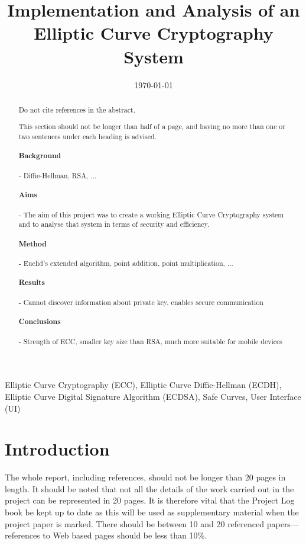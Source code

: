 \documentclass[12pt,a4paper]{article}
\title{Implementation and Analysis of an Elliptic Curve Cryptography System}
\author{} %
\date{\today}
\begin{document}
\maketitle

\begin{abstract}
Do not cite references in the abstract.

This section should not be longer than half of a page, and having no more than one or two sentences under each heading is advised.

\paragraph{Background} -
Diffie-Hellman, RSA, ...

\paragraph{Aims} -
The aim of this project was to create a working Elliptic Curve Cryptography system 
and to analyse that system in terms of security and efficiency. 

\paragraph{Method} -
Euclid's extended algorithm, point addition, point multiplication, ...

\paragraph{Results} -
Cannot discover information about private key, enables secure communication

\paragraph{Conclusions} -
Strength of ECC, smaller key size than RSA, much more suitable for mobile devices

\end{abstract}


\begin{keywords}
Elliptic Curve Cryptography (ECC), Elliptic Curve Diffie-Hellman (ECDH), Elliptic Curve Digital Signature Algorithm (ECDSA), 
Safe Curves, User Interface (UI)
\end{keywords}


\section{Introduction}
The whole report, including references, should not be longer than 20 pages in length.
It should be noted that not all the details of the work carried out in the project can be represented in 20 pages.
It is therefore vital that the Project Log book be kept up to date as this will be used as supplementary material when the project paper is marked.
There should be between 10 and 20 referenced papers---references to Web based pages should be less than 10\%.
\end{document}
